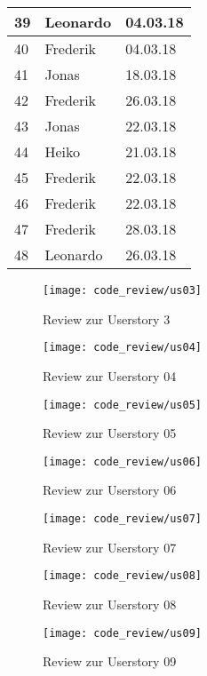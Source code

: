 \begin{center}
\begin{tabular}{|l|l|l|}
    39 & Leonardo   & 04.03.18 \\\hline
    40 & Frederik   & 04.03.18 \\\hline
    41 & Jonas      & 18.03.18 \\\hline
    42 & Frederik   & 26.03.18 \\\hline
    43 & Jonas      & 22.03.18 \\\hline
    44 & Heiko      & 21.03.18 \\\hline
    45 & Frederik   & 22.03.18 \\\hline
    46 & Frederik   & 22.03.18 \\\hline
    47 & Frederik   & 28.03.18 \\\hline
    48 & Leonardo   & 26.03.18 \\\hline
\end{tabular}
\end{center}

\begin{figure}[H]
\centering
\texttt{[image: code\_review/us03]}
	\caption{Review zur Userstory 3}
\end{figure}

\begin{figure}[H]
\centering
\texttt{[image: code\_review/us04]}
\caption{Review zur Userstory 04}
\end{figure}

\begin{figure}[H]
\centering
\texttt{[image: code\_review/us05]}
\caption{Review zur Userstory 05}
\end{figure}

\begin{figure}[H]
\centering
\texttt{[image: code\_review/us06]}
\caption{Review zur Userstory 06}
\end{figure}

\begin{figure}[H]
\centering
\texttt{[image: code\_review/us07]}
\caption{Review zur Userstory 07}
\end{figure}

\begin{figure}[H]
\centering
\texttt{[image: code\_review/us08]}
\caption{Review zur Userstory 08}
\end{figure}

\begin{figure}[H]
\centering
\texttt{[image: code\_review/us09]}
\caption{Review zur Userstory 09}
\end{figure}

